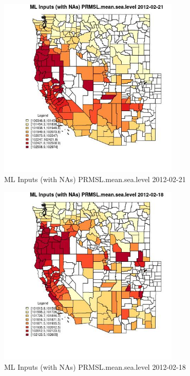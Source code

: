 \begin{figure} 
\centering  
\includegraphics[width=0.77\textwidth]{Code_Outputs/Report_ML_input_PM25_Step4_part_f_de_duplicated_aves_prioritize_24hr_obswNAs_CountyPRMSLmeansealevelMean2012-02-21.jpg} 
\caption{\label{fig:Report_ML_input_PM25_Step4_part_f_de_duplicated_aves_prioritize_24hr_obswNAsCountyPRMSLmeansealevelMean2012-02-21}ML Inputs (with NAs) PRMSL.mean.sea.level 2012-02-21} 
\end{figure} 
 

\begin{figure} 
\centering  
\includegraphics[width=0.77\textwidth]{Code_Outputs/Report_ML_input_PM25_Step4_part_f_de_duplicated_aves_prioritize_24hr_obswNAs_CountyPRMSLmeansealevelMean2012-02-18.jpg} 
\caption{\label{fig:Report_ML_input_PM25_Step4_part_f_de_duplicated_aves_prioritize_24hr_obswNAsCountyPRMSLmeansealevelMean2012-02-18}ML Inputs (with NAs) PRMSL.mean.sea.level 2012-02-18} 
\end{figure} 
 

